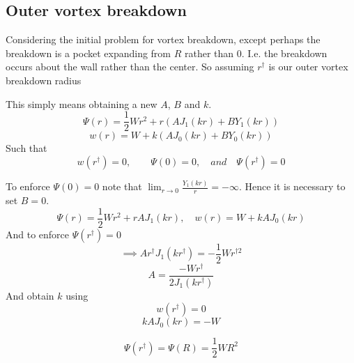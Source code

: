 \documentclass{X:/Documents/Coding/Latex/myreport}
\begin{document}












\clearpage
\subsection{Outer vortex breakdown}
Considering the initial problem for vortex breakdown, except perhaps the breakdown is a pocket expanding from $R$ rather than $0$. I.e. the breakdown occurs about the wall rather than the center.
So assuming $r^\dagger $ is our outer vortex breakdown radius


This simply means obtaining a new $A$, $B$ and $k$.
\[\Psi(r) = \frac12 W r^2 + r(A J_1(kr) + BY_1(kr))\]
\[w(r) = W + k(A J_0(kr) + B Y_0(kr))\]
Such that
\[w(r^\dagger) = 0,\qquad \Psi(0) = 0,\quad and \quad \Psi(r^\dagger) = 0  \]
 
To enforce $\Psi(0) = 0$ note that $\lim_{r\to 0} \frac{Y_1(kr)}{r} = -\infty$. Hence it is necessary to set $B = 0$. 
\[\Psi(r) = \frac12 Wr^2 + rAJ_1(kr), \quad w (r) = W + kAJ_0(kr)\]
And to enforce 
$\Psi(r^\dagger) = 0$
\[\implies Ar^\dagger J_1(kr^\dagger) = -\frac12 Wr^{\dagger2}\]
\[A = \frac{-Wr^{\dagger}}{2J_1(kr^\dagger)}\]
And obtain $k$ using
\[w(r^\dagger) = 0\]
\[k AJ_0(kr) = -W\]


\[\Psi(r^\dagger) = \Psi(R) = \frac12 WR^2\]





\end{document}

